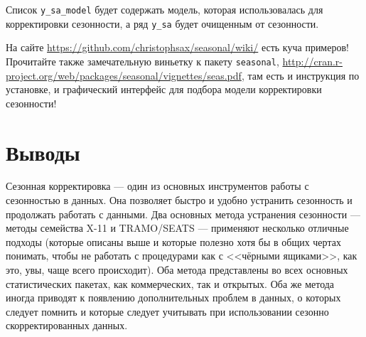 \documentclass[final,pdftex]{../../template/epsilonj}\usepackage[]{graphicx}\usepackage[]{color}
\begin{document}
Список \verb|y_sa_model| будет содержать модель, которая использовалась для корректировки сезонности, а ряд \verb|y_sa| будет очищенным от сезонности.

На сайте \url{https://github.com/christophsax/seasonal/wiki/} есть куча примеров! Прочитайте также замечательную виньетку к пакету \verb|seasonal|, \url{http://cran.r-project.org/web/packages/seasonal/vignettes/seas.pdf}, там есть и инструкция по установке, и графический интерфейс для подбора модели корректировки сезонности!


\section{Выводы}

Сезонная корректировка --- один из основных инструментов работы с сезонностью в данных. Она позволяет быстро и удобно устранить сезонность и продолжать работать с данными. Два основных метода устранения сезонности --- методы семейства X-11 и TRAMO/SEATS --- применяют несколько отличные подходы (которые описаны выше и которые полезно хотя бы в общих чертах понимать, чтобы не работать с процедурами как с <<чёрными ящиками>>, как это, увы, чаще всего происходит). Оба метода представлены во всех основных статистических пакетах, как коммерческих, так и открытых. Оба же метода иногда приводят к появлению дополнительных проблем в данных, о которых следует помнить и которые следует учитывать при использовании сезонно скорректированных данных.
\end{document}
